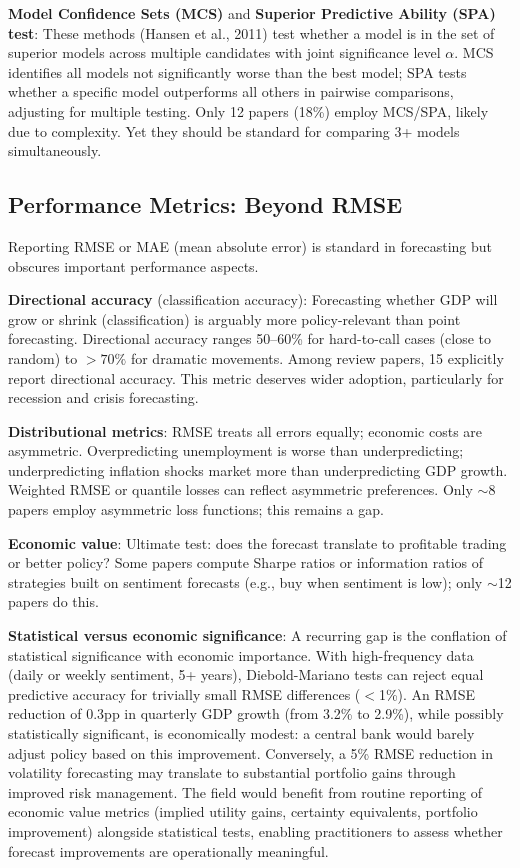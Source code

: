 \documentclass[11pt]{article}
\begin{document}
\textbf{Model Confidence Sets (MCS)} and \textbf{Superior Predictive Ability (SPA) test}: These methods (Hansen et al., 2011) test whether a model is in the set of superior models across multiple candidates with joint significance level $\alpha$. MCS identifies all models not significantly worse than the best model; SPA tests whether a specific model outperforms all others in pairwise comparisons, adjusting for multiple testing. Only 12 papers (18\%) employ MCS/SPA, likely due to complexity. Yet they should be standard for comparing 3+ models simultaneously.

\subsection{Performance Metrics: Beyond RMSE}

Reporting RMSE or MAE (mean absolute error) is standard in forecasting but obscures important performance aspects.

\textbf{Directional accuracy} (classification accuracy): Forecasting whether GDP will grow or shrink (classification) is arguably more policy-relevant than point forecasting. Directional accuracy ranges 50--60\% for hard-to-call cases (close to random) to $>70\%$ for dramatic movements. Among review papers, 15 explicitly report directional accuracy. This metric deserves wider adoption, particularly for recession and crisis forecasting.

\textbf{Distributional metrics}: RMSE treats all errors equally; economic costs are asymmetric. Overpredicting unemployment is worse than underpredicting; underpredicting inflation shocks market more than underpredicting GDP growth. Weighted RMSE or quantile losses can reflect asymmetric preferences. Only $\sim$8 papers employ asymmetric loss functions; this remains a gap.

\textbf{Economic value}: Ultimate test: does the forecast translate to profitable trading or better policy? Some papers compute Sharpe ratios or information ratios of strategies built on sentiment forecasts (e.g., buy when sentiment is low); only $\sim$12 papers do this.

\textbf{Statistical versus economic significance}: A recurring gap is the conflation of statistical significance with economic importance. With high-frequency data (daily or weekly sentiment, 5+ years), Diebold-Mariano tests can reject equal predictive accuracy for trivially small RMSE differences ($<$1\%). An RMSE reduction of 0.3pp in quarterly GDP growth (from 3.2\% to 2.9\%), while possibly statistically significant, is economically modest: a central bank would barely adjust policy based on this improvement. Conversely, a 5\% RMSE reduction in volatility forecasting may translate to substantial portfolio gains through improved risk management. The field would benefit from routine reporting of economic value metrics (implied utility gains, certainty equivalents, portfolio improvement) alongside statistical tests, enabling practitioners to assess whether forecast improvements are operationally meaningful.
\end{document}
